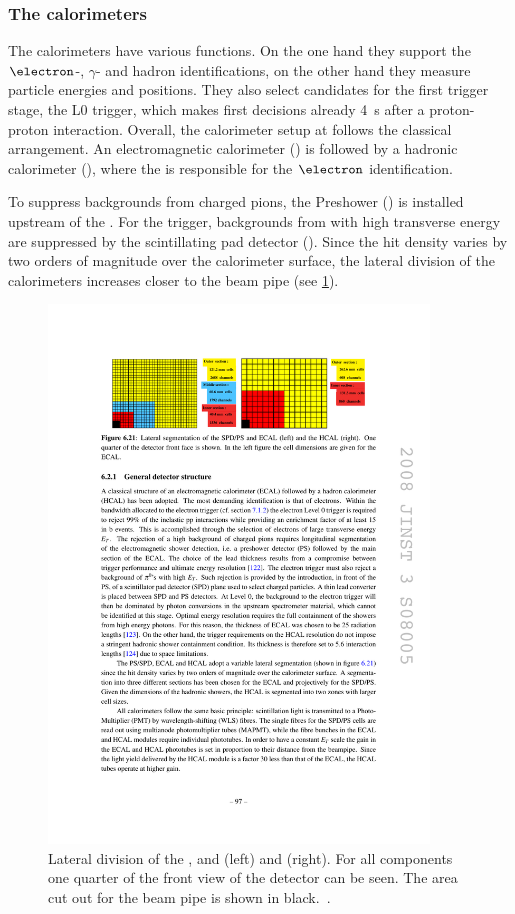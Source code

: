 \subsubsection*{The calorimeters}
\label{sec:calorimeters}

The calorimeters have various functions.
On the one hand they support the $\electron$-, $\gamma$- and hadron identifications, on the other hand they measure particle energies and positions.
They also select candidates for the first trigger stage, the L0 trigger, which makes first decisions already \SI{4}{\second} after a proton-proton interaction.
Overall, the calorimeter setup at \lhcb follows the classical arrangement.
An electromagnetic calorimeter (\ecal) is followed by a hadronic calorimeter (\hcal), where the \ecal is responsible for the $\electron$ identification.

To suppress backgrounds from charged pions, the Preshower (\presh) is installed upstream of the \ecal.
For the trigger, backgrounds from \piz with high transverse energy \et are suppressed by the scintillating pad detector (\spd).
Since the hit density varies by two orders of magnitude over the calorimeter surface, the lateral division of the calorimeters increases closer to the beam pipe (see \cref{fig:calorimeter}).
\begin{figure}[tbp]
    \centering
    \includegraphics[width=0.9\textwidth]{05lhcb/figs/calorimeter.pdf}
    \caption{Lateral division of the \presh, \spd and \ecal (left) and \hcal (right).
    For all components one quarter of the front view of the detector can be seen.
    The area cut out for the beam pipe is shown in black.~\cite{Alves:2008zz}.}
    \label{fig:calorimeter}
\end{figure}

